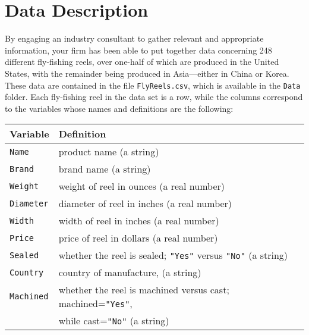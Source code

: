 \section{Data Description}


By engaging an industry consultant to gather relevant and appropriate 
information, your firm has been able to put together data concerning 248 
different fly-fishing reels, over one-half of which are produced in the 
United States, with the remainder being produced in Asia---either in China 
or Korea.  These data are contained in the file {\tt FlyReels.csv}, which is
available in the {\tt Data} folder.
Each fly-fishing reel in the data set is a row, while the columns correspond 
to the variables whose names and definitions are the following:

\bigskip
\begin{table}[ht]
\centering
\begin{tabular}{ll}
  \hline
    Variable & Definition \\
  \hline

    {\tt Name}        &product name (a string) \\ 
    {\tt Brand}       &brand name (a string) \\ 
    {\tt Weight}      &weight of reel in ounces (a real number) \\ 
    {\tt Diameter}    &diameter of reel in inches (a real number) \\ 
    {\tt Width}       &width of reel in inches (a real number) \\ 
    {\tt Price}       &price of reel in dollars (a real number) \\ 
    {\tt Sealed}      &whether the reel is sealed; {\tt "Yes"} versus
                        {\tt "No"} (a string) \\ 
    {\tt Country}     &country of manufacture, (a string) \\ 
    {\tt Machined}    &whether the reel is machined versus cast;
                        machined={\tt "Yes"}, \\ 
                      &while cast={\tt "No"} (a string) \\ 
  \hline
\end{tabular}
\end{table}
